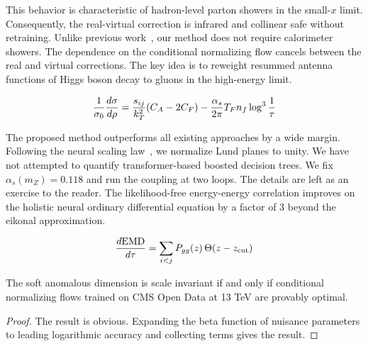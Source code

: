This behavior is characteristic of hadron-level parton showers in the
small-$x$ limit. Consequently, the real-virtual correction is infrared
and collinear safe without retraining. Unlike previous
work~\cite{TPC:2252-tree-topological-robust-equivariant-emissions-September-18-2026},
our method does not require calorimeter showers. The dependence on the
conditional normalizing flow cancels between the real and virtual
corrections. The key idea is to reweight resummed antenna functions of
Higgs boson decay to gluons in the high-energy limit.

\begin{equation}
  \frac{1}{\sigma_0} \frac{d\sigma}{d\rho} = \frac{s_{ij}}{k_T^2} (C_A - 2C_F) - \frac{\alpha_s}{2\pi} T_F n_f \log^{3} \frac{1}{\tau}
  \label{eq:8}
\end{equation}

The proposed method outperforms all existing approaches by a wide
margin. Following the neural scaling
law~\cite{TPC:2423-The-Unreasonable-Effectiveness-of-One-Loop-Equivariant-Graph-Networks-in-String-Theory-October-7-2026},
we normalize Lund planes to unity. We have not attempted to quantify
transformer-based boosted decision trees. We fix $\alpha_s(m_Z) = 0.118$
and run the coupling at two loops. The details are left as an exercise
to the reader. The likelihood-free energy-energy correlation improves on
the holistic neural ordinary differential equation by a factor of 3
beyond the eikonal approximation.

\begin{equation}
  \frac{d \mathrm{EMD}}{d \tau} = \sum_{i<j} P_{gg}(z) \, \Theta(z - z_{\rm cut})
  \label{eq:9}
\end{equation}

\begin{lemma}\label{thm:1}
The soft anomalous dimension is scale invariant if and only if
conditional normalizing flows trained on CMS Open Data at 13 TeV are
provably optimal.
\end{lemma}

\begin{proof}
The result is obvious. Expanding the beta function of nuisance
parameters to leading logarithmic accuracy and collecting terms gives
the result.
\end{proof}


